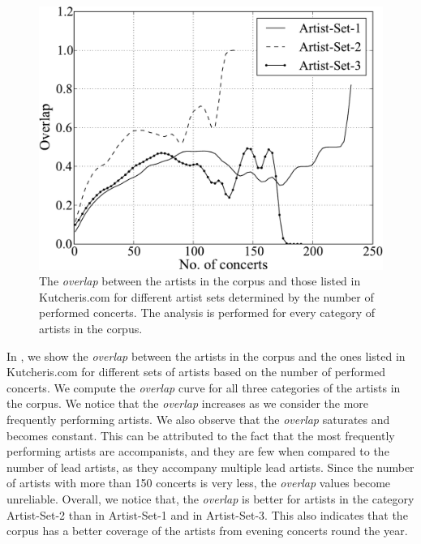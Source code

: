 \begin{figure}[h]
	\begin{center}
		\includegraphics[width=\figSizeSixtyFive]{ch04_datasets/figures/artist-coverage-vs-performances.pdf}
	\end{center}
	\caption[Overlap between the artists in the Carnatic music corpus and Kutcheris.com]{The \textit{overlap} between the artists in the corpus and those listed in Kutcheris.com for different artist sets determined by the number of performed concerts. The analysis is performed for every category of artists in the corpus.}
	\label{fig:artist_coverage_vs_number_of_concerts}
\end{figure}

In , we show the \textit{overlap} between the artists in the corpus and the ones listed in Kutcheris.com for different sets of artists based on the number of performed concerts. We compute the \textit{overlap} curve for all three categories of the artists in the corpus. We notice that the \textit{overlap} increases as we consider the more frequently performing artists. We also observe that the \textit{overlap} saturates and becomes constant. This can be attributed to the fact that the most frequently performing artists are accompanists, and they are few when compared to the number of lead artists, as they accompany multiple lead artists. Since the number of artists with more than 150 concerts is very less, the \textit{overlap}
values become unreliable. Overall, we notice that, the \textit{overlap} is better for artists in the category Artist-Set-2 than in Artist-Set-1 and in Artist-Set-3. This also indicates that the corpus has a better coverage of the artists from evening concerts round the year.


